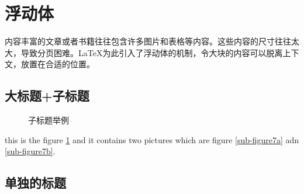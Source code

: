\documentclass[12pt]{elegantpaper} %
\begin{document}
\section{浮动体}

内容丰富的文章或者书籍往往包含许多图片和表格等内容。这些内容的尺寸往往太大，导致分页困难。\LaTeX 为此引入了浮动体的机制，令大块的内容可以脱离上下文，放置在合适的位置。





\subsection{大标题+子标题}

\begin{figure}[tbp]
	\centering
	\qquad
	\caption{子标题举例}
	\label{figure7}
\end{figure}

this is the figure \ref{figure7} and it contains two pictures which are figure \ref{sub-figure7a} adn \ref{sub-figure7b}.

\subsection{单独的标题}
\end{document}
